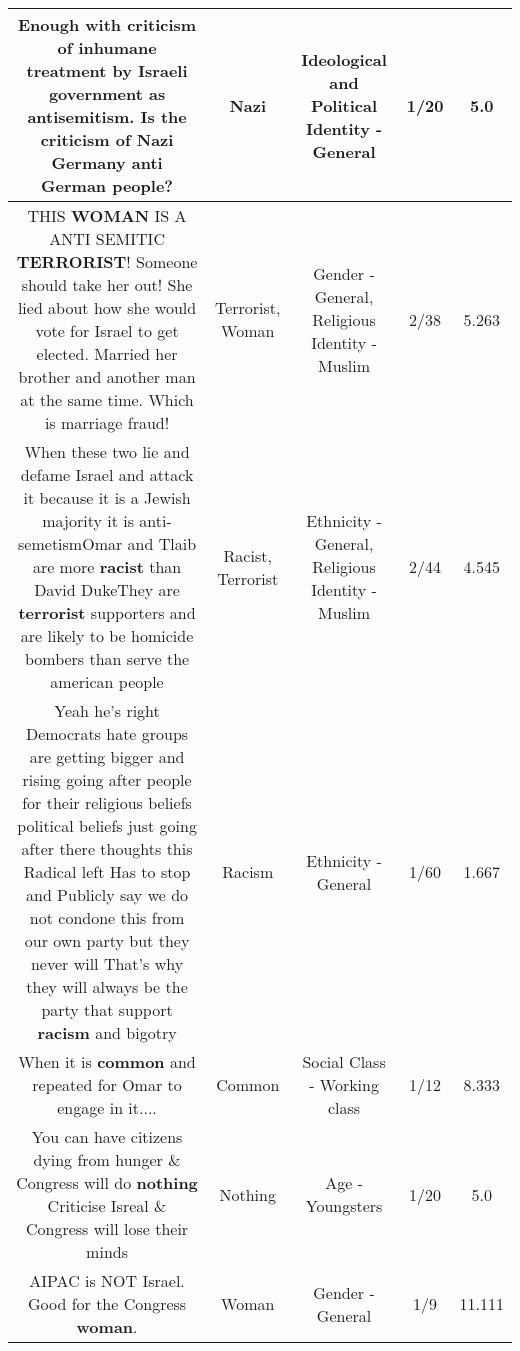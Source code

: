 \documentclass[11pt]{article}
\newlength\mylength
\begin{document}
\begin{center}
\begin{longtable}{|C{.65\mylength}|C{.30\mylength}|C{.12\mylength}|C{.12\mylength}|C{.12\mylength}|}
  \small Enough with criticism of inhumane treatment by Israeli government as antisemitism. Is the criticism of \textbf{Nazi} Germany anti German people?\normalsize   & Nazi &  Ideological and Political Identity - General & 1/20 & 5.0 \\  \hline
  \small THIS \textbf{WOMAN} IS A ANTI SEMITIC \textbf{TERRORIST}! Someone should take her out! She lied about how she would vote for Israel to get elected. Married her brother and another man at the same time. Which is marriage fraud!\normalsize   & Terrorist, Woman & Gender - General, Religious Identity - Muslim & 2/38 & 5.263 \\  \hline
  \small When these two lie and defame Israel and attack it because it is a Jewish majority it is anti-semetismOmar and Tlaib are more \textbf{racist} than David DukeThey are \textbf{terrorist} supporters and are likely to  be homicide bombers than serve the american people\normalsize   & Racist, Terrorist & Ethnicity - General, Religious Identity - Muslim & 2/44 & 4.545 \\  \hline
  \small Yeah he's right Democrats hate groups are getting bigger and rising going after people for their religious beliefs political beliefs just going after there thoughts this Radical left Has to stop  and Publicly say we do not condone this from our own party but they never will That's why they will always be the party that support \textbf{racism} and bigotry\normalsize   & Racism & Ethnicity - General & 1/60 & 1.667 \\  \hline
  \small When it is \textbf{common} and repeated for Omar to engage in it....\normalsize   & Common & Social Class - Working class & 1/12 & 8.333 \\  \hline
  \small You can have citizens dying from hunger \& Congress will do \textbf{nothing} Criticise Isreal \& Congress will lose their minds\normalsize   & Nothing & Age - Youngsters & 1/20 & 5.0 \\  \hline
  \small AIPAC is NOT Israel. Good for the Congress \textbf{woman}.\normalsize   & Woman & Gender - General & 1/9 & 11.111 \\  \hline

\end{longtable}
\end{center}
\end{document}
